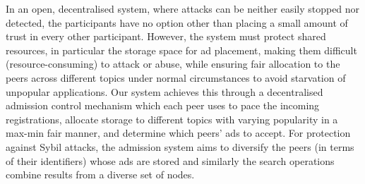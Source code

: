 In an open, decentralised system, where attacks can be neither easily stopped nor detected, the participants have no option other than placing a small amount of trust in every other participant. However, the system must protect shared resources, in particular the storage space for ad placement, making them difficult (\ie resource-consuming) to attack or abuse, while ensuring fair allocation to the peers across different topics under normal circumstances to avoid starvation of unpopular applications. Our system achieves this through a decentralised admission control mechanism which each peer uses to pace the incoming registrations, allocate storage to different topics with varying popularity in a max-min fair manner, and determine which peers' ads to accept. For protection against Sybil attacks, the admission system aims to diversify the peers (in terms of their identifiers) whose ads are stored and similarly the search operations combine results from a diverse set of nodes. 




